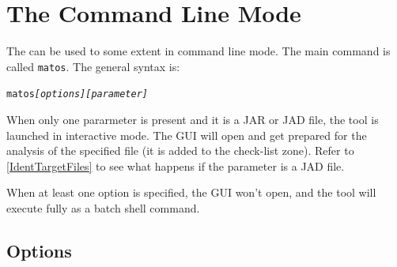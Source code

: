 

\section{The Command Line Mode} \label{CmdLineMode}
The \ma can be used to some extent in command line mode. The main
command is called \texttt{matos}. The general syntax is:
\begin{alltt}
matos \emph{[options] [parameter]} 
\end{alltt}

When only one pararmeter is present and it is a JAR or JAD file, the tool
is launched in interactive mode. 
The GUI will open and get prepared for the analysis of the specified file (it
is added to the check-list zone). Refer to  \ref{IdentTargetFiles} to see what
happens if the parameter is a JAD file.

When at least one option is specified, the GUI won't open, and the
tool will execute fully as a batch shell command.

\subsection{Options}

